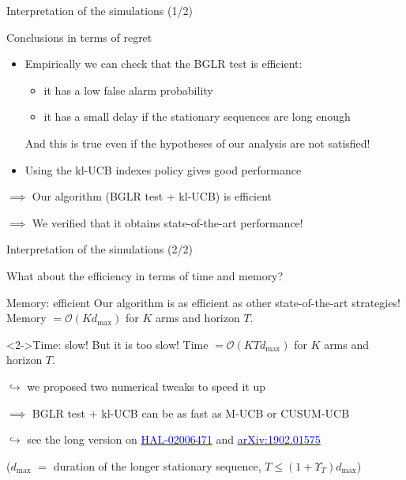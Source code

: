 \documentclass[11pt,english,ignorenonframetext,]{beamer}
\providecommand{\tightlist}{%
  \setlength{\itemsep}{0pt}\setlength{\parskip}{0pt}}
\begin{document}
\begin{frame}{Interpretation of the simulations (1/2)}

  \begin{block}{Conclusions in terms of regret}
    \begin{itemize}
      \item
      Empirically we can check that the \alert{BGLR test is efficient}:
      \begin{itemize}\tightlist
        \item
        it has a \alert{low false alarm probability}
        \item
        it has a \alert{small delay} if the stationary sequences are long enough
      \end{itemize}
      And this is true even if the hypotheses of our analysis are not satisfied!
      \item
      Using the kl-UCB indexes policy gives good performance
    \end{itemize}
    $\implies$ Our algorithm (BGLR test + kl-UCB) is efficient

    $\implies$ We verified that it obtains state-of-the-art performance!
  \end{block}

\end{frame}


\begin{frame}{Interpretation of the simulations (2/2)}

  What about the efficiency in terms of time and memory?

  \begin{block}{Memory: efficient}
    Our algorithm is as efficient as other state-of-the-art strategies!\\
    Memory $= \mathcal{O}(K d_{\max})$
    for $K$ arms and horizon $T$.
  \end{block}

  \begin{alertblock}<2->{Time: slow!}
    But it is too slow!
    Time $= \mathcal{O}(K T d_{\max})$
    for $K$ arms and horizon $T$.

    $\hookrightarrow$ we proposed two numerical tweaks to speed it up

    $\implies$ BGLR test + kl-UCB can be as fast as M-UCB or CUSUM-UCB

    $\hookrightarrow$  see the long version on \href{https://hal.inria.fr/hal-02006471}{\textcolor{blue}{HAL-02006471}} and \href{https://arxiv.org/abs/1902.01575}{\textcolor{blue}{arXiv:1902.01575}}
  \end{alertblock}

  ($d_{\max}$ $=$ duration of the longer stationary sequence, $T \leq (1+\Upsilon_T) d_{\max}$)

\end{frame}
\end{document}
